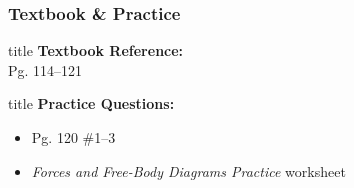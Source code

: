 \documentclass{beamer}
\begin{document}
\begin{frame}
\frametitle{Textbook & Practice}

\begin{beamercolorbox}[rounded=true, shadow=true, wd=\textwidth, sep=0.8em]{title}
\textbf{Textbook Reference:} \\
Pg. 114–121
\end{beamercolorbox}

\vspace{0.5cm}

\begin{beamercolorbox}[rounded=true, shadow=true, wd=\textwidth, sep=0.8em]{title}
\textbf{Practice Questions:}
\begin{itemize}
    \item Pg. 120 \#1–3
    \item \textit{Forces and Free-Body Diagrams Practice} worksheet
\end{itemize}
\end{beamercolorbox}


\end{frame}
\end{document}

